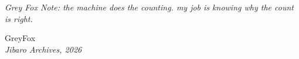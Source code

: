 \documentclass[11pt,a4paper]{article}
\newcommand{\gfnote}[1]{\par{\itshape Grey Fox Note: #1}\par}
\begin{document}
\gfnote{the machine does the counting. my job is knowing why the count is right.}

\begin{flushright}
GreyFox\\
\textit{Jibaro Archives, 2026}
\end{flushright}
\end{document}
